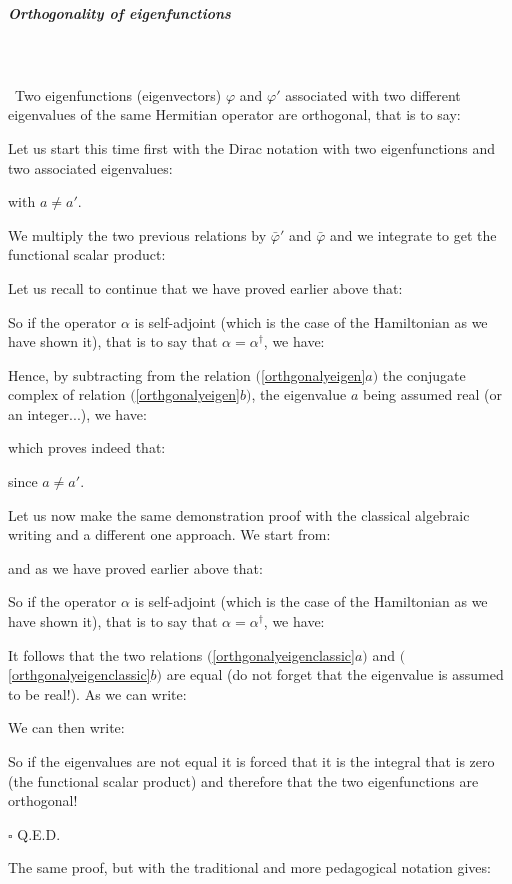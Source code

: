 	\subparagraph{Orthogonality of eigenfunctions}\mbox{}\\\\\
	Two eigenfunctions (eigenvectors) $\varphi$ and $\varphi'$ associated with two different eigenvalues of the same Hermitian operator are orthogonal, that is to say:
	
	\begin{dem}
	Let us start this time first with the Dirac notation with two eigenfunctions and two associated eigenvalues:
	
	with $a\neq a'$.
	
	We multiply the two previous relations by $\bar{\varphi}'$ and $\bar{\varphi}$ and we integrate to get the functional scalar product:
	
	Let us recall to continue that we have proved earlier above that:
	
	So if the operator $\alpha$ is self-adjoint (which is the case of the Hamiltonian as we have shown it), that is to say that $\alpha=\alpha^\dagger$, we have:
	
	Hence, by subtracting from the relation $($\ref{orthgonalyeigen}$a)$ the conjugate complex of relation $($\ref{orthgonalyeigen}$b)$, the eigenvalue $a$ being assumed real (or an integer...), we have:
	
	which proves indeed that:
	
	since $a\neq a'$.
	
	Let us now make the same demonstration proof with the classical algebraic writing and a different one approach. We start from:
	
	and as we have proved earlier above that:
	
	So if the operator $\alpha$ is self-adjoint (which is the case of the Hamiltonian as we have shown it), that is to say that $\alpha=\alpha^\dagger$, we have:
	
	It follows that the two relations $($\ref{orthgonalyeigenclassic}$a)$ and $($\ref{orthgonalyeigenclassic}$b)$ are equal (do not forget that the eigenvalue is assumed to be real!). As we can write:
	
	We can then write:
	
	So if the eigenvalues are not equal it is forced that it is the integral that is zero (the functional scalar product) and therefore that the two eigenfunctions are orthogonal!
	\begin{flushright}
		$\square$  Q.E.D.
	\end{flushright}
	\end{dem}
	The same proof, but with the traditional and more pedagogical notation gives:
	
